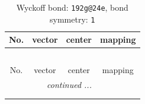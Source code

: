 \documentclass[fleqn,8pt]{jsarticle}
\begin{document}
\renewcommand{\arraystretch}{1.2}
\begin{longtable}{cccc}
\caption{Wyckoff bond: {\tt 192g@24e}, bond symmetry: {\tt 1}}
 \\
 \hline \hline
No. & vector & center & mapping \\ \hline \endfirsthead

\multicolumn{3}{l}{\tablename\ \thetable{}} \\
 \hline \hline
No. & vector & center & mapping \\ \hline \endhead

 \hline \hline
\multicolumn{3}{r}{\footnotesize\it continued ...} \\ \endfoot

 \hline \hline
\multicolumn{3}{r}{} \\ \endlastfoot


\end{longtable}
\end{document}
